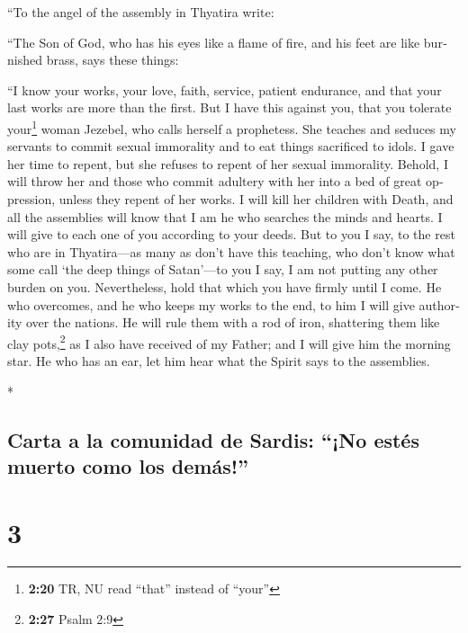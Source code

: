 \begin{paracol}{2}
\begin{otherlanguage}{english}
 ``To the angel of the assembly in Thyatira write:

``The Son of God, who has his eyes like a flame of fire, and his feet
are like burnished brass, says these things:

 ``I know your works, your love, faith, service, patient
endurance, and that your last works are more than the first.
 But I have this against you, that you tolerate
your\footnote{\textbf{2:20} TR, NU read ``that'' instead of ``your''}
woman Jezebel, who calls herself a prophetess. She teaches and seduces
my servants to commit sexual immorality and to eat things sacrificed to
idols.  I gave her time to repent, but she refuses to
repent of her sexual immorality.  Behold, I will throw
her and those who commit adultery with her into a bed of great
oppression, unless they repent of her works.  I will kill
her children with Death, and all the assemblies will know that I am he
who searches the minds and hearts. I will give to each one of you
according to your deeds.  But to you I say, to the rest
who are in Thyatira---as many as don't have this teaching, who don't
know what some call `the deep things of Satan'---to you I say, I am not
putting any other burden on you.  Nevertheless, hold that
which you have firmly until I come.  He who overcomes,
and he who keeps my works to the end, to him I will give authority over
the nations.  He will rule them with a rod of iron,
shattering them like clay pots,\footnote{\textbf{2:27} Psalm 2:9} as I
also have received of my Father;  and I will give him the
morning star.  He who has an ear, let him hear what the
Spirit says to the assemblies.

\end{otherlanguage}

\switchcolumn[0]*

\hypertarget{carta-a-la-comunidad-de-sardis-no-estuxe9s-muerto-como-los-demuxe1s}{%
\subsection{Carta a la comunidad de Sardis: ``¡No estés muerto como los
demás!''}\label{carta-a-la-comunidad-de-sardis-no-estuxe9s-muerto-como-los-demuxe1s}}

\hypertarget{section-4}{%
\section{3}\label{section-4}}


\end{paracol}
